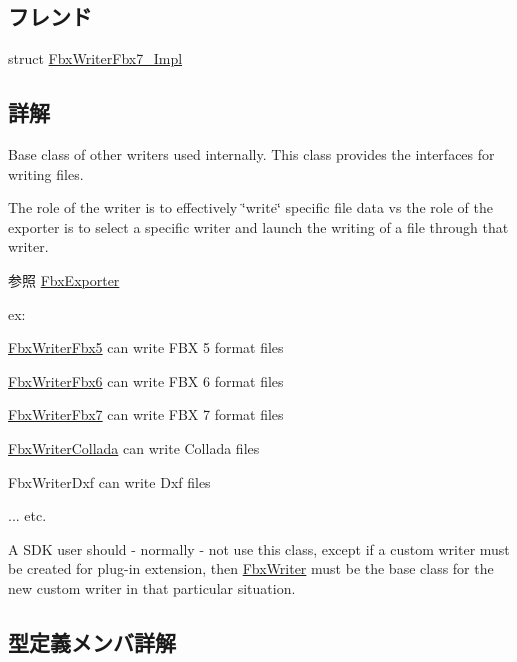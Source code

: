 \subsection*{フレンド}
\begin{DoxyCompactItemize}
\item 
struct \hyperlink{class_fbx_writer_af1c8c15ac15cf43655af7772383daefd}{Fbx\+Writer\+Fbx7\+\_\+\+Impl}
\end{DoxyCompactItemize}


\subsection{詳解}
Base class of other writers used internally. This class provides the interfaces for writing files.

The role of the writer is to effectively \char`\"{}write\char`\"{} specific file data vs the role of the exporter is to select a specific writer and launch the writing of a file through that writer. \begin{DoxySeeAlso}{参照}
\hyperlink{class_fbx_exporter}{Fbx\+Exporter}
\end{DoxySeeAlso}
ex\+:
\begin{DoxyItemize}
\item \hyperlink{class_fbx_writer_fbx5}{Fbx\+Writer\+Fbx5} can write F\+BX 5 format files
\item \hyperlink{class_fbx_writer_fbx6}{Fbx\+Writer\+Fbx6} can write F\+BX 6 format files
\item \hyperlink{class_fbx_writer_fbx7}{Fbx\+Writer\+Fbx7} can write F\+BX 7 format files
\item \hyperlink{class_fbx_writer_collada}{Fbx\+Writer\+Collada} can write Collada files
\item Fbx\+Writer\+Dxf can write Dxf files
\item ... etc.
\end{DoxyItemize}

A S\+DK user should -\/ normally -\/ not use this class, except if a custom writer must be created for plug-\/in extension, then \hyperlink{class_fbx_writer}{Fbx\+Writer} must be the base class for the new custom writer in that particular situation. 

\subsection{型定義メンバ詳解}
\mbox{\label{class_fbx_writer_aa634a7d29a01f8197f814437644e845b}} 
